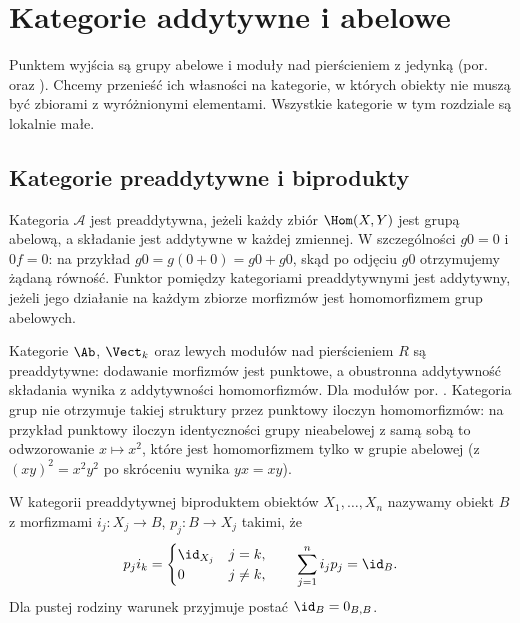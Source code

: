 \section{Kategorie addytywne i abelowe}\label{cat:sec:abelian-categories}
Punktem wyjścia są grupy abelowe i moduły nad pierścieniem z jedynką (por.  oraz ). Chcemy przenieść ich własności na kategorie, w których obiekty nie muszą być zbiorami z wyróżnionymi elementami. Wszystkie kategorie w tym rozdziale są lokalnie małe.

\subsection{Kategorie preaddytywne i biprodukty}
\begin{definicja}\label{cat:def:preadditive}
Kategoria $\mathcal A$ jest preaddytywna, jeżeli każdy zbiór $\Hom(X,Y)$ jest grupą abelową, a składanie jest addytywne w każdej zmiennej. W szczególności $g0=0$ i $0f=0$: na przykład $g0=g(0+0)=g0+g0$, skąd po odjęciu $g0$ otrzymujemy żądaną równość. Funktor pomiędzy kategoriami preaddytywnymi jest addytywny, jeżeli jego działanie na każdym zbiorze morfizmów jest homomorfizmem grup abelowych.
\end{definicja}
\begin{przyklad}
Kategorie $\Ab$, $\Vect_k$ oraz lewych modułów nad pierścieniem $R$ są preaddytywne: dodawanie morfizmów jest punktowe, a obustronna addytywność składania wynika z addytywności homomorfizmów. Dla modułów por. . Kategoria grup nie otrzymuje takiej struktury przez punktowy iloczyn homomorfizmów: na przykład punktowy iloczyn identyczności grupy nieabelowej z samą sobą to odwzorowanie $x\mapsto x^2$, które jest homomorfizmem tylko w grupie abelowej (z $(xy)^2=x^2y^2$ po skróceniu wynika $yx=xy$).
\end{przyklad}
\begin{definicja}[Biprodukt]\label{cat:def:biproduct}
W kategorii preaddytywnej biproduktem obiektów $X_1,\ldots,X_n$ nazywamy obiekt $B$ z morfizmami $i_j:X_j\to B$, $p_j:B\to X_j$ takimi, że
\[
 p_j i_k=\begin{cases}\id_{X_j}&j=k,\\0&j\ne k,\end{cases}
 \qquad \sum_{j=1}^n i_jp_j=\id_B.
\]
Dla pustej rodziny warunek przyjmuje postać $\id_B=0_{B,B}$.
\end{definicja}
